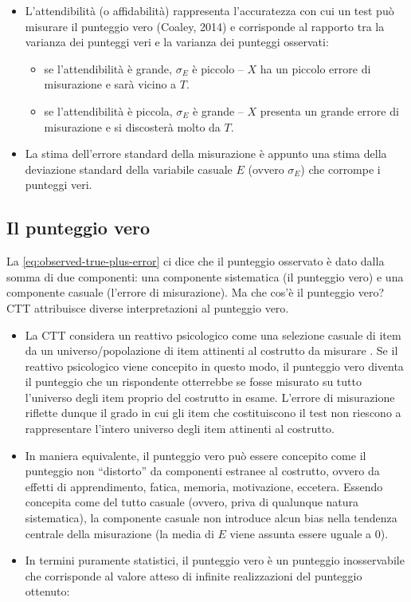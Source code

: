 \documentclass[
  11pt,
]{krantz}
\providecommand{\tightlist}{%
  \setlength{\itemsep}{0pt}\setlength{\parskip}{0pt}}
\theoremstyle{definition}
\theoremstyle{definition}
\theoremstyle{definition}
\theoremstyle{definition}
\theoremstyle{remark}
\begin{document}
\begin{itemize}
\tightlist
\item
  L'attendibilità (o affidabilità) rappresenta l'accuratezza con cui un test può misurare il punteggio vero (Coaley, 2014) e corrisponde al rapporto tra la varianza dei punteggi veri e la varianza dei punteggi osservati:

  \begin{itemize}
  \tightlist
  \item
    se l'attendibilità è grande, \(\sigma_E\) è piccolo -- \(X\) ha un piccolo errore di misurazione e sarà vicino a \(T\).
  \item
    se l'attendibilità è piccola, \(\sigma_E\) è grande -- \(X\) presenta un grande errore di misurazione e si discosterà molto da \(T\).
  \end{itemize}
\item
  La stima dell'errore standard della misurazione è appunto una stima della deviazione standard della variabile casuale \(E\) (ovvero \(\sigma_E\)) che corrompe i punteggi veri.
\end{itemize}

\hypertarget{il-punteggio-vero}{%
\subsection{Il punteggio vero}\label{il-punteggio-vero}}

La \eqref{eq:observed-true-plus-error} ci dice che il punteggio osservato è dato dalla somma di due componenti: una componente sistematica (il punteggio vero) e una componente casuale (l'errore di misurazione). Ma che cos'è il punteggio vero? CTT attribuisce diverse interpretazioni al punteggio vero.

\begin{itemize}
\tightlist
\item
  La CTT considera un reattivo psicologico come una selezione casuale di item da un universo/popolazione di item attinenti al costrutto da misurare \citep{nunnally1994psychometric, kline2013handbook}. Se il reattivo psicologico viene concepito in questo modo, il punteggio vero diventa il punteggio che un rispondente otterrebbe se fosse misurato su tutto l'universo degli item proprio del costrutto in esame. L'errore di misurazione riflette dunque il grado in cui gli item che costituiscono il test non riescono a rappresentare l'intero universo degli item attinenti al costrutto.
\item
  In maniera equivalente, il punteggio vero può essere concepito come il punteggio non ``distorto'' da componenti estranee al costrutto, ovvero da effetti di apprendimento, fatica, memoria, motivazione, eccetera. Essendo concepita come del tutto casuale (ovvero, priva di qualunque natura sistematica), la componente casuale non introduce alcun bias nella tendenza centrale della misurazione (la media di \(E\) viene assunta essere uguale a 0).
\item
  In termini puramente statistici, il punteggio vero è un punteggio inosservabile che corrisponde al valore atteso di infinite realizzazioni del punteggio ottenuto:
\end{itemize}
\end{document}
